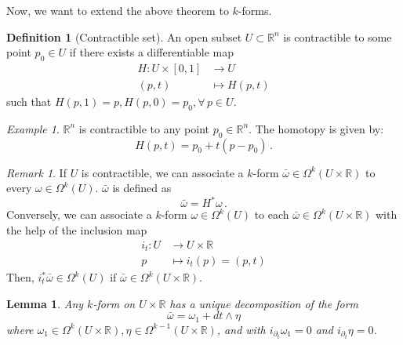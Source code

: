 \documentclass[a4paper,11pt,titlepage, article, oneside]{memoir}
\numberwithin{equation}{section}
\newtheorem{lemma}[theorem]{Lemma}
\theoremstyle{definition}
\newtheorem{definition}[theorem]{Definition}
\theoremstyle{remark}
\newtheorem{remark}[theorem]{Remark}
\newtheorem{example}[theorem]{Example}
\newcommand{\rfield}{\mathbb{R}}
\begin{document}
Now, we want to extend the above theorem to $k$-forms.

\begin{definition} [Contractible set]
  An open subset $U \subset \rfield^n$ is contractible to some point $p_0 \in U$ if there exists a differentiable map
  \begin{align}
    H \colon U \times [0, 1] &\rightarrow U \\
    (p,t) &\mapsto H(p, t) \nonumber
  \end{align}
  such that $H(p, 1) = p, H(p, 0) = p_0, \forall\, p \in U$.
\end{definition}

\begin{tcolorbox}\begin{example}
$\rfield^n$ is contractible to any point $p_0 \in \rfield^n$. The homotopy is given by:
$$H(p, t) = p_0 + t(p- p_0) \, .$$
\end{example}\end{tcolorbox}

\begin{remarkbox}\begin{remark}
  If $U$ is contractible, we can associate a $k$-form $\bar\omega \in \Omega^k(U \times \rfield)$ to every $\omega \in \Omega^k(U)$. $\bar \omega$ is defined as
  \begin{equation}
    \bar\omega = H^* \omega \, .
  \end{equation}
  Conversely, we can associate a $k$-form $\omega \in \Omega^k(U)$ to each $\bar \omega \in \Omega^k(U \times \rfield)$ with the help of the inclusion map
  \begin{align}
    i_t \colon U &\rightarrow U \times \rfield \\
    p &\mapsto i_t(p) = (p,t)\nonumber
  \end{align}
  Then, $i_t^* \bar \omega \in \Omega^k(U)$ if $\bar \omega \in \Omega^k(U \times \rfield)$.
 \end{remark}\end{remarkbox}

 \begin{lemma}   \label{lemmaform1}
  Any $k$-form on $U \times \rfield$ has a unique decomposition of the form
  \begin{equation}
    \bar \omega = \omega_1 + dt \wedge \eta
  \end{equation}
  where $\omega_1 \in \Omega^k(U \times \rfield), \eta \in \Omega^{k-1}(U \times \rfield)$, and with $i_{\partial_t} \omega_1 = 0$ and $i_{\partial_t} \eta = 0$.
  \end{lemma}
\end{document}
